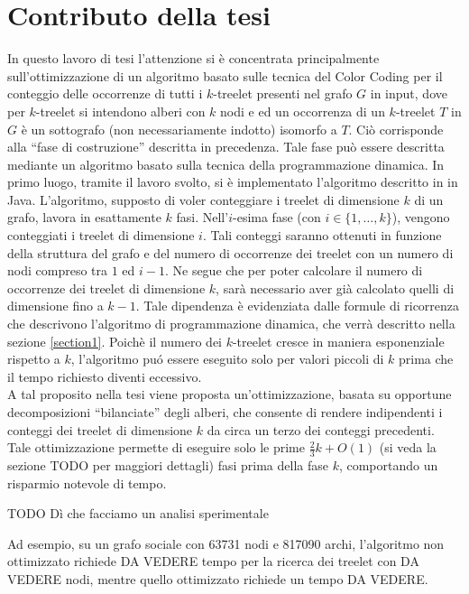 \section{Contributo della tesi}

In questo lavoro di tesi l'attenzione si è concentrata principalmente sull'ottimizzazione di un algoritmo basato sulle tecnica del Color Coding per il conteggio delle occorrenze di tutti i $k$-treelet presenti nel grafo $G$ in input, dove per $k$-treelet  si intendono alberi con $ k $ nodi e ed un occorrenza di un $k$-treelet $T$ in $G$ è un sottografo (non necessariamente indotto) isomorfo a $T$.
Ci\`o corrisponde alla ``fase di costruzione'' descritta in precedenza. Tale fase pu\`o essere descritta mediante un algoritmo basato sulla tecnica della programmazione dinamica.
In primo luogo, tramite il lavoro svolto, si \`e implementato l'algoritmo descritto in  \cite{bressan2018motif} in Java.
L'algoritmo, supposto di voler conteggiare i treelet di dimensione $ k $ di un grafo, lavora in esattamente  $k$ fasi.
Nell'$i$-esima fase (con $i \in \{1, \dots, k\}$), vengono conteggiati i treelet di dimensione $i$.
Tali conteggi saranno ottenuti in funzione della struttura del grafo e del numero di occorrenze dei treelet con un numero di nodi compreso tra $1$ ed $i-1$.
Ne segue che per poter calcolare il numero di occorrenze dei treelet di dimensione $ k $, sar\`a necessario aver gi\`a calcolato quelli di dimensione fino a $ k-1$.
Tale dipendenza \`e evidenziata dalle formule di ricorrenza che descrivono l'algoritmo di programmazione dinamica, che verr\`a descritto nella sezione \ref{section1}.
Poich\`e il numero dei $ k $-treelet cresce in maniera esponenziale rispetto a $ k $, l'algoritmo pu\'o essere eseguito solo per valori piccoli di $ k $ prima che il tempo richiesto diventi eccessivo.\\
A tal proposito nella tesi viene proposta un'ottimizzazione, basata su opportune decomposizioni ``bilanciate'' degli alberi, che consente di rendere indipendenti i conteggi dei treelet di dimensione $ k $ da circa un terzo dei conteggi precedenti.
Tale ottimizzazione permette di eseguire solo le prime $\frac{2}{3} k + O(1)$ (si veda la sezione TODO per maggiori dettagli) fasi prima della fase $ k $, comportando un risparmio notevole di tempo.

TODO Dì che facciamo un analisi sperimentale

Ad esempio, su un grafo sociale con 63731 nodi e 817090 archi, l'algoritmo non ottimizzato richiede DA VEDERE tempo per la ricerca dei treelet con DA VEDERE nodi, mentre quello ottimizzato richiede un tempo DA VEDERE.


